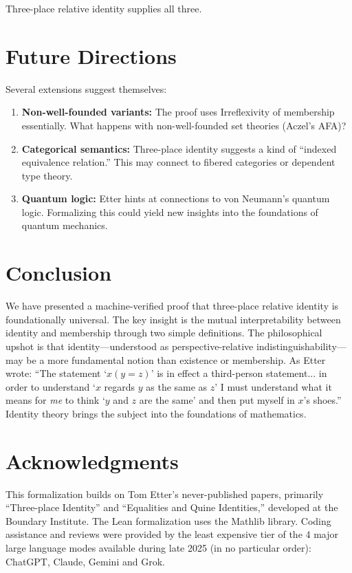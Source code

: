 \documentclass{ws-rv9x6}
\theoremstyle{remark}
\begin{document}
Three-place relative identity supplies all three.

\section{Future Directions}

Several extensions suggest themselves:

\begin{enumerate}
    \item \textbf{Non-well-founded variants:} The proof uses Irreflexivity of membership essentially. What happens with non-well-founded set theories (Aczel's AFA)?
    \item \textbf{Categorical semantics:} Three-place identity suggests a kind of ``indexed equivalence relation.'' This may connect to fibered categories or dependent type theory.
    \item \textbf{Quantum logic:} Etter hints at connections to von Neumann's quantum logic. Formalizing this could yield new insights into the foundations of quantum mechanics.
\end{enumerate}

\section{Conclusion}

We have presented a machine-verified proof that three-place relative identity is foundationally universal. The key insight is the mutual interpretability between identity and membership through two simple definitions. The philosophical upshot is that identity---understood as perspective-relative indistinguishability---may be a more fundamental notion than existence or membership. As Etter wrote: ``The statement `$x(y=z)$' is in effect a third-person statement... in order to understand `$x$ regards $y$ as the same as $z$' I must understand what it means for \emph{me} to think `$y$ and $z$ are the same' and then put myself in $x$'s shoes.'' Identity theory brings the subject into the foundations of mathematics.

\section*{Acknowledgments}

This formalization builds on Tom Etter's never-published papers, primarily ``Three-place Identity'' and ``Equalities and Quine Identities,'' developed at the Boundary Institute. The Lean formalization uses the Mathlib library\cite{mathlib}. Coding assistance and reviews were provided by the least expensive tier of the 4 major large language modes available during late 2025 (in no particular order): ChatGPT, Claude, Gemini and Grok.
\end{document}
